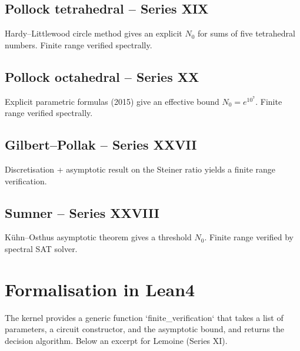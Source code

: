 \documentclass[11pt,a4paper]{article}
\begin{document}
\subsection{Pollock tetrahedral – Series XIX}
Hardy–Littlewood circle method gives an explicit \(N_0\) for sums of five tetrahedral numbers. Finite range verified spectrally.

\subsection{Pollock octahedral – Series XX}
Explicit parametric formulas (2015) give an effective bound \(N_0 = e^{10^7}\). Finite range verified spectrally.

\subsection{Gilbert–Pollak – Series XXVII}
Discretisation + asymptotic result on the Steiner ratio yields a finite range verification.

\subsection{Sumner – Series XXVIII}
Kühn–Osthus asymptotic theorem gives a threshold \(N_0\). Finite range verified by spectral SAT solver.

\section{Formalisation in Lean4}

The kernel provides a generic function `finite_verification` that takes a list of parameters, a circuit constructor, and the asymptotic bound, and returns the decision algorithm. Below an excerpt for Lemoine (Series XI).
\end{document}
